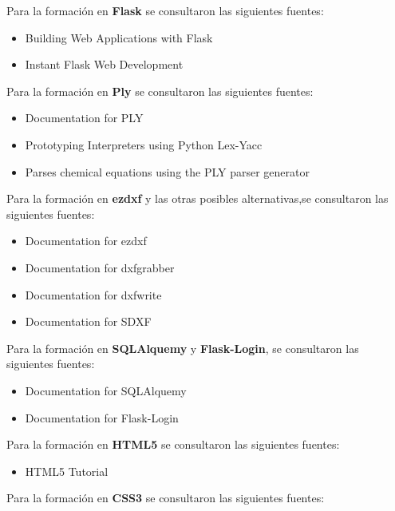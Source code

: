 Para la formación en \textbf{Flask} se consultaron las siguientes fuentes:

\begin{itemize}
\item Building Web Applications  with Flask \cite{Flask1}
\item Instant Flask Web Development \cite{Flask2}
\end{itemize}

Para la formación en \textbf{Ply} se consultaron las siguientes fuentes:

\begin{itemize}
\item Documentation for PLY  \cite{HomePly}
\item Prototyping Interpreters using Python Lex-Yacc \cite{Ply2}
\item Parses chemical equations using the PLY parser generator \cite{Ply3}
\end{itemize}

Para la formación en \textbf{ezdxf} y las otras posibles alternativas,se consultaron las siguientes fuentes:

\begin{itemize}
\item Documentation for ezdxf \cite{ezdxf}
\item Documentation for dxfgrabber \cite{dxfgrabber}
\item Documentation for dxfwrite \cite{dxfwrite}
\item Documentation for SDXF \cite{sdxf}
\end{itemize}

Para la formación en \textbf{SQLAlquemy}  y \textbf{Flask-Login}, se consultaron las siguientes fuentes:

\begin{itemize}
\item Documentation for SQLAlquemy \cite{SQLAlquemy}
\item Documentation for Flask-Login \cite{Flasklogin}
\end{itemize}

Para la formación en \textbf{HTML5} se consultaron las siguientes fuentes:

\begin{itemize}
\item HTML5 Tutorial \cite{html5}
\end{itemize}

Para la formación en \textbf{CSS3} se consultaron las siguientes fuentes:


